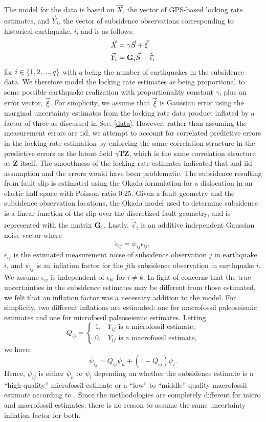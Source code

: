 {The model for the data is based on $\vec{X}$, the vector of GPS-based locking rate estimates, and $\vec{Y}_i$, the vector of subsidence observations corresponding to historical earthquake, $i$, and is as follows:
\begin{align}
\vec{X} &= \gamma \vec{S} + \vec{\xi}  \label{gpsDat} \\
\vec{Y}_i &= \mathbf{G}_i \vec{S} + \tilde{\vec{\epsilon}}_i \label{subDat}
\end{align}
for $i \in \left\{1,2,...,q\right\}$ with $q$ being the number of earthquakes in the subsidence data.  We therefore model the locking rate estimates as being proportional to some possible earthquake realization with proportionality constant $\gamma$, plus an error vector, $\vec{\xi}$.  For simplicity, we assume that $\vec{\xi}$ is Gaussian error using the marginal uncertainty estimates from the locking rate data product inflated by a factor of three as discussed in Sec. \ref{data}.  However, rather than assuming the measurement errors are iid, we attempt to account for correlated predictive errors in the locking rate estimation by enforcing the same correlation structure in the predictive errors as the latent field $\gamma \mathbf{T} \mathbf{Z}$, which is the same correlation structure as $\mathbf{Z}$ itself. The smoothness of the locking rate estimates indicated that and iid assumption and the errors would have been problematic. The subsidence resulting from fault slip is estimated using the Okada formulation \citep{okada} for a dislocation in an elastic half-space with Poisson ratio 0.25.  Given a fault geometry and the subsidence observation locations, the Okada model used to determine subsidence is a linear function of the slip over the discretized fault geometry, and is represented with the matrix $\mathbf{G}_i$. Lastly, $\tilde{\vec{\epsilon}}_i$ is an additive independent Gaussian noise vector where 
$$ \tilde{\epsilon}_{ij} = \psi_{ij} \epsilon_{ij}, $$
$\epsilon_{ij}$ is the estimated measurement noise of subsidence observation $j$ in earthquake $i$, and $\psi_{ij}$ is an inflation factor for the $j$th subsidence observation in earthquake $i$.  We assume $\epsilon_{ij}$ is independent of $\epsilon_{kl}$ for $i \neq k$.  In light of concerns that the true uncertainties in the subsidence estimates may be different from those estimated, we felt that an inflation factor was a necessary addition to the model.  For simplicity, two different inflations are estimated: one for macrofossil paleoseismic estimates and one for microfossil paleoseismic estimates.  Letting 
$$ Q_{ij} = \begin{cases}
1, & \text{$Y_{ij}$ is a microfossil estimate,} \\
0, & \text{$Y_{ij}$ is a macrofossil estimate,}
\end{cases} $$
we have:
$$ \psi_{ij} = Q_{ij} \psi_h + (1-Q_{ij}) \psi_l. $$
Hence, $\psi_{ij}$ is either $\psi_h$ or $\psi_l$ depending on whether the subsidence estimate is a ``high quality'' microfossil estimate or a ``low'' to ``middle'' quality macrofossil estimate according to \citet{leonard2010}.  Since the methodologies are completely different for micro and macrofossil estimates, there is no reason to assume the same uncertainty inflation factor for both.

}
